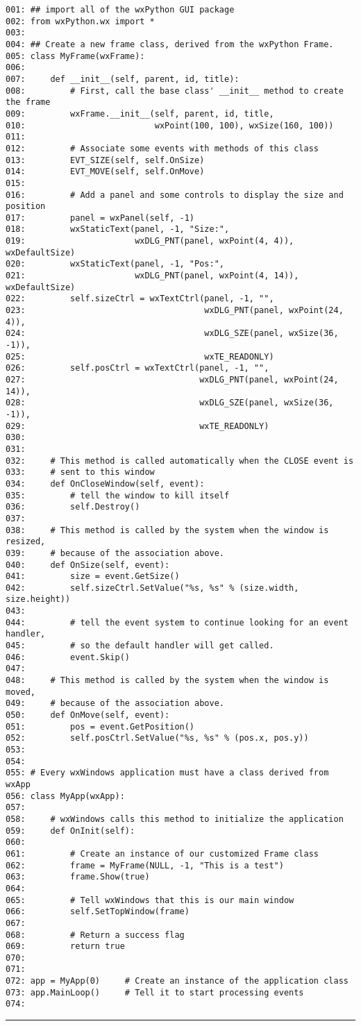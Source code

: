 \begin{verbatim}
001: ## import all of the wxPython GUI package
002: from wxPython.wx import *
003:
004: ## Create a new frame class, derived from the wxPython Frame.
005: class MyFrame(wxFrame):
006:
007:     def __init__(self, parent, id, title):
008:         # First, call the base class' __init__ method to create the frame
009:         wxFrame.__init__(self, parent, id, title,
010:                          wxPoint(100, 100), wxSize(160, 100))
011:
012:         # Associate some events with methods of this class
013:         EVT_SIZE(self, self.OnSize)
014:         EVT_MOVE(self, self.OnMove)
015:
016:         # Add a panel and some controls to display the size and position
017:         panel = wxPanel(self, -1)
018:         wxStaticText(panel, -1, "Size:",
019:                      wxDLG_PNT(panel, wxPoint(4, 4)),  wxDefaultSize)
020:         wxStaticText(panel, -1, "Pos:",
021:                      wxDLG_PNT(panel, wxPoint(4, 14)), wxDefaultSize)
022:         self.sizeCtrl = wxTextCtrl(panel, -1, "",
023:                                    wxDLG_PNT(panel, wxPoint(24, 4)),
024:                                    wxDLG_SZE(panel, wxSize(36, -1)),
025:                                    wxTE_READONLY)
026:         self.posCtrl = wxTextCtrl(panel, -1, "",
027:                                   wxDLG_PNT(panel, wxPoint(24, 14)),
028:                                   wxDLG_SZE(panel, wxSize(36, -1)),
029:                                   wxTE_READONLY)
030:
031:
032:     # This method is called automatically when the CLOSE event is
033:     # sent to this window
034:     def OnCloseWindow(self, event):
035:         # tell the window to kill itself
036:         self.Destroy()
037:
038:     # This method is called by the system when the window is resized,
039:     # because of the association above.
040:     def OnSize(self, event):
041:         size = event.GetSize()
042:         self.sizeCtrl.SetValue("%s, %s" % (size.width, size.height))
043:
044:         # tell the event system to continue looking for an event handler,
045:         # so the default handler will get called.
046:         event.Skip()
047:
048:     # This method is called by the system when the window is moved,
049:     # because of the association above.
050:     def OnMove(self, event):
051:         pos = event.GetPosition()
052:         self.posCtrl.SetValue("%s, %s" % (pos.x, pos.y))
053:
054:
055: # Every wxWindows application must have a class derived from wxApp
056: class MyApp(wxApp):
057:
058:     # wxWindows calls this method to initialize the application
059:     def OnInit(self):
060:
061:         # Create an instance of our customized Frame class
062:         frame = MyFrame(NULL, -1, "This is a test")
063:         frame.Show(true)
064:
065:         # Tell wxWindows that this is our main window
066:         self.SetTopWindow(frame)
067:
068:         # Return a success flag
069:         return true
070:
071:
072: app = MyApp(0)     # Create an instance of the application class
073: app.MainLoop()     # Tell it to start processing events
074:
\end{verbatim}
\hrule

